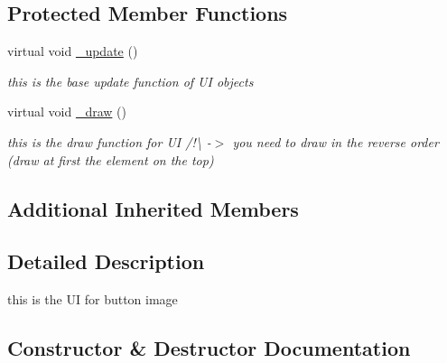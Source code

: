 \subsection*{Protected Member Functions}
\begin{DoxyCompactItemize}
\item 
\mbox{\label{class_button_image_u_i_a9f0a37050956baa365de40daf3b05bb5}} 
virtual void \hyperlink{class_button_image_u_i_a9f0a37050956baa365de40daf3b05bb5}{\+\_\+update} ()
\begin{DoxyCompactList}\small\item\em this is the base update function of UI objects \end{DoxyCompactList}\item 
\mbox{\label{class_button_image_u_i_aea117caa97ce8cb0d888776a9872a405}} 
virtual void \hyperlink{class_button_image_u_i_aea117caa97ce8cb0d888776a9872a405}{\+\_\+draw} ()
\begin{DoxyCompactList}\small\item\em this is the draw function for UI /!\textbackslash{} -\/$>$ you need to draw in the reverse order (draw at first the element on the top) \end{DoxyCompactList}\end{DoxyCompactItemize}
\subsection*{Additional Inherited Members}


\subsection{Detailed Description}
this is the UI for button image 

\subsection{Constructor \& Destructor Documentation}
\mbox{\label{class_button_image_u_i_a7410aec54c74f6aa027825fc75a2c328}} 
